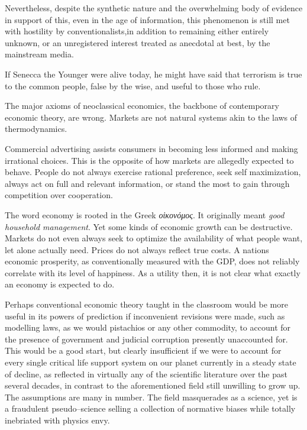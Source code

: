Nevertheless, despite the synthetic nature and the overwhelming body of evidence in support of this, even in the age of information, this phenomenon is still met with hostility by conventionalists, in addition to remaining either entirely unknown, or an unregistered interest treated as anecdotal at best, by the mainstream media. 

If Senecca the Younger were alive today, he might have said that terrorism is true to the common people, false by the wise, and useful to those who rule.


The major axioms of neoclassical economics, the backbone of contemporary economic theory, are wrong. Markets are not natural systems akin to the laws of thermodynamics.
\footnotecite[lasn2012]

Commercial advertising assists consumers in becoming less informed and making irrational choices. This is the opposite of how markets are allegedly expected to behave. People do not always exercise rational preference, seek self maximization, always act on full and relevant information, or stand the most to gain through competition over cooperation.

The word economy is rooted in the Greek {\it οἰκονόμος}. It originally meant {\it good household management}. Yet some kinds of economic growth can be destructive. Markets do not even always seek to optimize the availability of what people want, let alone actually need.
\footnotecite[h2oil]
\footnotecite[cobb1999]
\footnotecite[extras={ See sections 4.6 and 4.11.}][agenda_21]
Prices do not always reflect true costs.
\footnotecite[oxfam2004]
\footnotecite[raj2010]
A nations economic prosperity, as conventionally measured with the GDP, does not reliably correlate with its level of happiness.
 As a utility then, it is not clear what exactly an economy is expected to do.

Perhaps conventional economic theory taught in the classroom would be more useful in its powers of prediction if inconvenient revisions were made, such as modelling laws, as we would pistachios or any other commodity, to account for the presence of government and judicial corruption presently unaccounted for. This would be a good start, but clearly insufficient if we were to account for every single critical life support system on our planet currently in a steady state of decline, as reflected in virtually any of the scientific literature over the past several decades, in contrast to the aforementioned field still unwilling to grow up. The assumptions are many in number. The field masquerades as a science, yet is a fraudulent pseudo--science selling a collection of normative biases while totally inebriated with physics envy.

